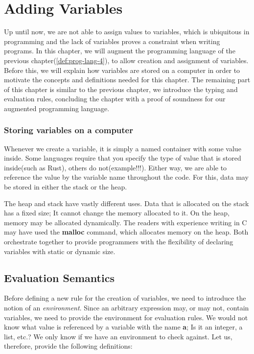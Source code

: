 \chapter{Adding Variables}

Up until now, we are not able to assign values to variables, which is ubiquitous in programming and the lack of variables proves a constraint when writing programs. In this chapter, we will augment the programming language of the previous chapter(\cref{def:prog-lang-4}), to allow creation and assignment of variables. Before this, we will explain how variables are stored on a computer in order to motivate the concepts and definitions needed for this chapter. The remaining part of this chapter is similar to the previous chapter, we introduce the typing and evaluation rules, concluding the chapter with a proof of soundness for our augmented programming language.

\subsection{Storing variables on a computer}

Whenever we create a variable, it is simply a named container with some value inside. Some languages require that you specify the type of value that is stored inside(such as Rust), others do not(example!!!). Either way, we are able to reference the value by the variable name throughout the code. For this, data may be stored in either the stack or the heap. 

The heap and stack have vastly different uses. Data that is allocated on the stack has a fixed size; It cannot change the memory allocated to it. On the heap, memory may be allocated dynamically. The readers with experience writing in C may have used the \textbf{malloc} command, which allocates memory on the heap. Both orchestrate together to provide programmers with the flexibility of declaring variables with static or dynamic size. 

\section{Evaluation Semantics}

Before defining a new rule for the creation of variables, we need to introduce the notion of an \emph{environment}. Since an arbitrary expression may, or may not, contain variables, we need to provide the environment for evaluation rules. We would not know what value is referenced by a variable with the name \textbf{a}; Is it an integer, a list, etc.? We only know if we have an environment to check against. Let us, therefore, provide the following definitions:

